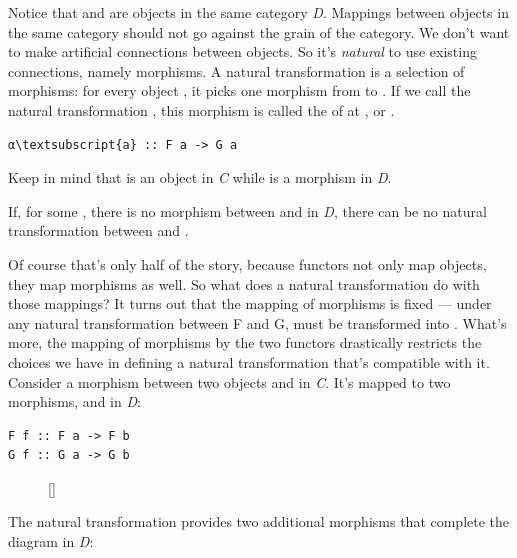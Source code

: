 \noindent
Notice that  and  are objects in the same
category \emph{D}. Mappings between objects in the same category should
not go against the grain of the category. We don't want to make
artificial connections between objects. So it's \emph{natural} to use
existing connections, namely morphisms. A natural transformation is a
selection of morphisms: for every object , it picks one
morphism from  to . If we call the natural
transformation , this morphism is called the 
of  at , or .

\begin{Verbatim}[commandchars=\\\{\}]
α\textsubscript{a} :: F a -> G a
\end{Verbatim}
Keep in mind that  is an object in \emph{C} while 
is a morphism in \emph{D}.

If, for some , there is no morphism between  and
 in \emph{D}, there can be no natural transformation
between  and .

Of course that's only half of the story, because functors not only map
objects, they map morphisms as well. So what does a natural
transformation do with those mappings? It turns out that the mapping of
morphisms is fixed --- under any natural transformation between F and G,
 must be transformed into . What's more, the
mapping of morphisms by the two functors drastically restricts the
choices we have in defining a natural transformation that's compatible
with it. Consider a morphism  between two objects 
and  in \emph{C}. It's mapped to two morphisms, 
and  in \emph{D}:

\begin{verbatim}
F f :: F a -> F b
G f :: G a -> G b
\end{verbatim}

\begin{figure}
\raisebox{0pt}[\dimexpr{}\baselineskip\relax]{
}%
\end{figure}
\noindent
The natural transformation  provides two additional morphisms
that complete the diagram in \emph{D}:

